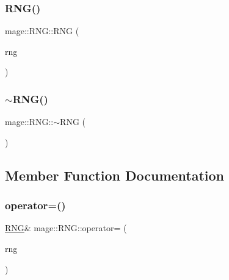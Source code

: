 \mbox{\label{classmage_1_1_r_n_g_aea109c4ab1644a5294d7c2c1031a50c9}} 
\subsubsection{\texorpdfstring{R\+N\+G()}{RNG()}\hspace{0.1cm}{\footnotesize\ttfamily [3/3]}}
{\footnotesize\ttfamily mage\+::\+R\+N\+G\+::\+R\+NG (\begin{DoxyParamCaption}\item[{\mbox{\hyperlink{classmage_1_1_r_n_g}{R\+NG}} \&\&}]{rng }\end{DoxyParamCaption})\hspace{0.3cm}{\ttfamily [default]}}

\mbox{\label{classmage_1_1_r_n_g_a20d24aabf31837e48a38b9ca221b0a9b}} 
\subsubsection{\texorpdfstring{$\sim$\+R\+N\+G()}{~RNG()}}
{\footnotesize\ttfamily mage\+::\+R\+N\+G\+::$\sim$\+R\+NG (\begin{DoxyParamCaption}{ }\end{DoxyParamCaption})\hspace{0.3cm}{\ttfamily [default]}}



\subsection{Member Function Documentation}
\mbox{\label{classmage_1_1_r_n_g_a38a0a4296338162fe105012cb4d13318}} 
\subsubsection{\texorpdfstring{operator=()}{operator=()}\hspace{0.1cm}{\footnotesize\ttfamily [1/2]}}
{\footnotesize\ttfamily \mbox{\hyperlink{classmage_1_1_r_n_g}{R\+NG}}\& mage\+::\+R\+N\+G\+::operator= (\begin{DoxyParamCaption}\item[{const \mbox{\hyperlink{classmage_1_1_r_n_g}{R\+NG}} \&}]{rng }\end{DoxyParamCaption})\hspace{0.3cm}{\ttfamily [delete]}}

